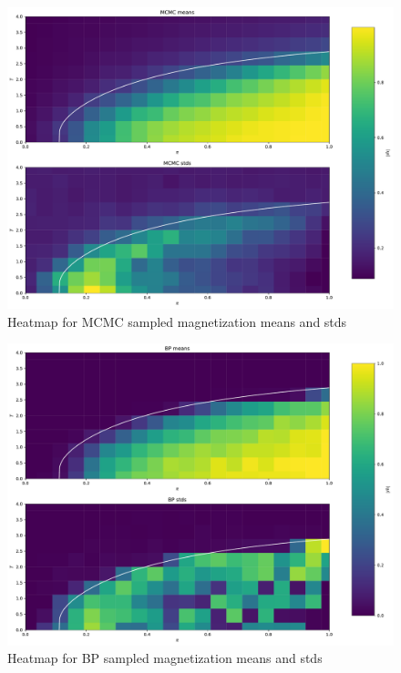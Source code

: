 \documentclass[handout]{beamer}
\begin{document}
\begin{frame}[plain]
    \begin{figure}
        \centering
        \includegraphics[width=.8\textwidth]{mcmc_heatmap}
        \caption{Heatmap for MCMC sampled magnetization means and stds}
        \label{fig:mcmc_heatmap}
    \end{figure}
\end{frame}

\begin{frame}[plain]
    \begin{figure}
        \centering
        \includegraphics[width=.8\textwidth]{bp_heatmap}
        \caption{Heatmap for BP sampled magnetization means and stds}
        \label{fig:bp_heatmap}
    \end{figure}
\end{frame}
\end{document}
